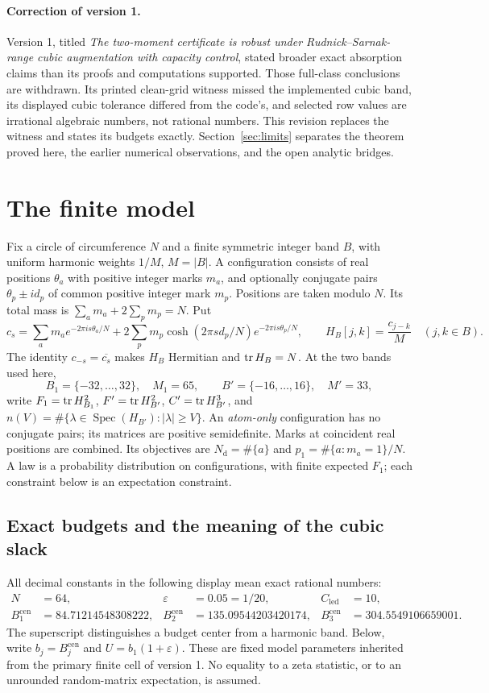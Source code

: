\documentclass[11pt]{article}
\theoremstyle{definition}\newtheorem{definition}[theorem]{Definition}
\theoremstyle{remark}\newtheorem{remark}[theorem]{Remark}
\newcommand{\Nd}{N_{\mathrm d}}\newcommand{\one}{\mathbf 1}
\begin{document}
\paragraph{Correction of version 1.}
Version 1, titled \emph{The two-moment certificate is robust under
Rudnick--Sarnak-range cubic augmentation with capacity control}, stated
broader exact absorption claims than its proofs and computations supported.
Those full-class conclusions are withdrawn. Its printed clean-grid witness
missed the implemented cubic band, its displayed cubic tolerance differed
from the code's, and selected row values are irrational algebraic numbers,
not rational numbers. This revision replaces the witness and states its
budgets exactly. Section~\ref{sec:limits} separates the theorem proved here,
the earlier numerical observations, and the open analytic bridges.

\section{The finite model}\label{sec:model}
Fix a circle of circumference $N$ and a finite symmetric integer band $B$,
with uniform harmonic weights $1/M$, $M=|B|$. A configuration consists of
real positions $\theta_a$ with positive integer marks $m_a$, and optionally
conjugate pairs $\theta_p\pm id_p$ of common positive integer mark $m_p$.
Positions are taken modulo $N$. Its total mass is
$\sum_a m_a+2\sum_p m_p=N$.
Put
\[
 c_s=\sum_a m_a e^{-2\pi i s\theta_a/N}
       +2\sum_p m_p\cosh(2\pi s d_p/N)e^{-2\pi i s\theta_p/N},
 \qquad H_B[j,k]=\frac{c_{j-k}}{M}\quad(j,k\in B).
\]
The identity $c_{-s}=\overline{c_s}$ makes $H_B$ Hermitian and
$\operatorname{tr} H_B=N$. At the two bands used here,
\[
 B_1=\{-32,\ldots,32\},\quad M_1=65,
 \qquad B'=\{-16,\ldots,16\},\quad M'=33,
\]
write $F_1=\operatorname{tr} H_{B_1}^2$, $F'=\operatorname{tr} H_{B'}^2$, $C'=\operatorname{tr} H_{B'}^3$, and
$n(V)=\#\{\lambda\in\operatorname{Spec}(H_{B'}):|\lambda|\ge V\}$.
An \emph{atom-only} configuration has no conjugate pairs; its matrices are
positive semidefinite. Marks at coincident real positions are combined.
Its objectives are $\Nd=\#\{a\}$ and $p_1=\#\{a:m_a=1\}/N$.
A law is a probability distribution on configurations, with finite expected
$F_1$; each constraint below is an expectation constraint.

\subsection{Exact budgets and the meaning of the cubic slack}
All decimal constants in the following display mean exact rational numbers:
\begin{align*}
 N&=64,&\varepsilon&=0.05=1/20,&C_{\mathrm{led}}&=10,\\
 B_1^{\mathrm{cen}}&=84.71214548308222,
 &B_2^{\mathrm{cen}}&=135.09544203420174,
 &B_3^{\mathrm{cen}}&=304.5549106659001.
\end{align*}
The superscript distinguishes a budget center from a harmonic band. Below,
write $b_j=B_j^{\mathrm{cen}}$ and $U=b_1(1+\varepsilon)$.
These are fixed model parameters inherited from the primary finite cell of
version 1. No equality to a zeta statistic, or to an unrounded random-matrix
expectation, is assumed.
\end{document}
